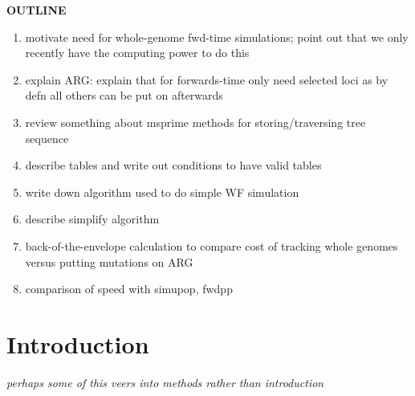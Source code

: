 \documentclass{article}
\newcommand{\plr}[1]{{\em \color{blue} #1}}
\begin{document}
\textbf{OUTLINE}
\begin{enumerate}
    \item motivate need for whole-genome fwd-time simulations; point out that we only recently have the computing power to do this
    \item explain ARG: explain that for forwards-time only need selected loci as by defn all others can be put on afterwards
    \item review something about msprime methods for storing/traversing tree sequence
    \item describe tables and write out conditions to have valid tables
    \item write down algorithm used to do simple WF simulation
    \item describe simplify algorithm
    \item back-of-the-envelope calculation to compare cost of tracking whole genomes versus putting mutations on ARG
    \item comparison of speed with simupop, fwdpp
\end{enumerate}


\section*{Introduction}

\plr{perhaps some of this veers into methods rather than introduction}
\end{document}
